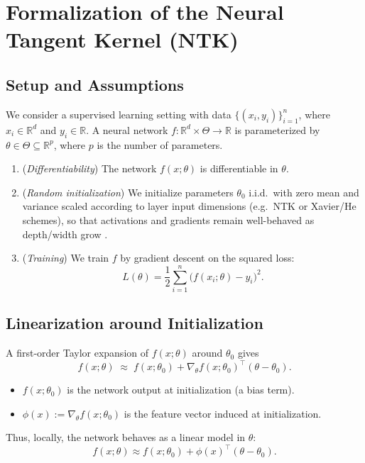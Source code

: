 \section{Formalization of the Neural Tangent Kernel (NTK)}\label{sec:ntk-formalization}

\subsection{Setup and Assumptions}

We consider a supervised learning setting with data $\{(x_i,y_i)\}_{i=1}^n$,
where $x_i \in \mathbb{R}^d$ and $y_i \in \mathbb{R}$. A neural network
$f:\mathbb{R}^d \times \Theta \to \mathbb{R}$ is parameterized by $\theta \in
	\Theta \subseteq \mathbb{R}^p$, where $p$ is the number of parameters.

\begin{assumption}\label{ass:model}
	\leavevmode
	\begin{enumerate}
		\item (\emph{Differentiability}) The network $f(x ;\theta)$ is differentiable in $\theta$.
		\item (\emph{Random initialization}) We initialize parameters $\theta_0$ i.i.d.\ with zero mean and variance scaled according to layer input dimensions (e.g.\ NTK or Xavier/He schemes), so that activations and gradients remain well-behaved as depth/width grow \citep{neal1996priors, jacot2018ntk, lee2020wide}.
		\item (\emph{Training})
		      We train $f$ by gradient descent on the squared loss:
		      \[
			      L(\theta) = \frac{1}{2}\sum_{i=1}^n \big(f(x_i;\theta) - y_i\big)^2.
		      \]
	\end{enumerate}
\end{assumption}


\subsection{Linearization around Initialization}

A first-order Taylor expansion of $f(x;\theta)$ around $\theta_0$ gives
\[
	f(x;\theta) \;\approx\; f(x;\theta_0) + \nabla_\theta f(x;\theta_0)^\top (\theta - \theta_0).
\]
\begin{itemize}
	\item $f(x;\theta_0)$ is the network output at initialization (a bias term).
	\item $\phi(x) := \nabla_\theta f(x;\theta_0)$ is the feature vector induced at initialization.
\end{itemize}
Thus, locally, the network behaves as a linear model in $\theta$:
\[
	f(x;\theta) \approx f(x;\theta_0) + \phi(x)^\top (\theta - \theta_0).
\]

